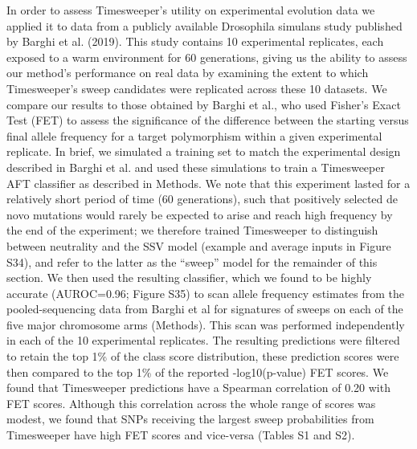 In order to assess Timesweeper’s utility on experimental evolution data we applied it to data from a publicly available Drosophila simulans study published by Barghi et al. (2019). This study contains 10 experimental replicates, each exposed to a warm environment for 60 generations, giving us the ability to assess our method’s performance on real data by examining the extent to which Timesweeper’s sweep candidates were replicated across these 10 datasets. We compare our results to those obtained by Barghi et al., who used Fisher’s Exact Test (FET) to assess the significance of the difference between the starting versus final allele frequency for a target polymorphism within a given experimental replicate. 
In brief, we simulated a training set to match the experimental design described in Barghi et al. and used these simulations to train a Timesweeper AFT classifier as described in Methods. We note that this experiment lasted for a relatively short period of time (60 generations), such that positively selected de novo mutations would rarely be expected to arise and reach high frequency by the end of the experiment; we therefore trained Timesweeper to distinguish between neutrality and the SSV model (example and average inputs in Figure S34), and refer to the latter as the “sweep” model for the remainder of this section. We then used the resulting classifier, which we found to be highly accurate (AUROC=0.96; Figure S35) to scan allele frequency estimates from the pooled-sequencing data from Barghi et al for signatures of sweeps on each of the five major chromosome arms (Methods). This scan was performed independently in each of the 10 experimental replicates. The resulting predictions were filtered to retain the top 1\% of the class score distribution, these prediction scores were then compared to the top 1\% of the reported -log10(p-value) FET scores. We found that Timesweeper predictions have a Spearman correlation of 0.20 with FET scores. Although this correlation across the whole range of scores was modest, we found that SNPs receiving the largest sweep probabilities from Timesweeper have high FET scores and vice-versa (Tables S1 and S2).

